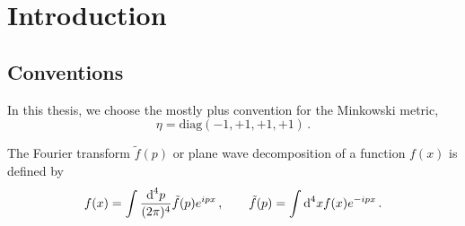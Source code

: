 \chapter{Introduction}

\section{Conventions}

In this thesis, we choose the mostly plus convention for the Minkowski metric,
\begin{equation}
    \eta=\text{diag}(-1,+1,+1,+1)\,.
\end{equation}

The Fourier transform $\tilde{f}(p)$ or plane wave decomposition of a function $f(x)$ is defined by
\begin{equation}
    f(x)=\int\frac{\text{d}^4p}{(2\pi)^4}\tilde{f}(p)e^{{i} px}\,,\qquad \tilde{f}(p)=\int\text{d}^4x f(x)e^{-{i} px}\,.
    \label{eq:FourierConvention}
\end{equation}